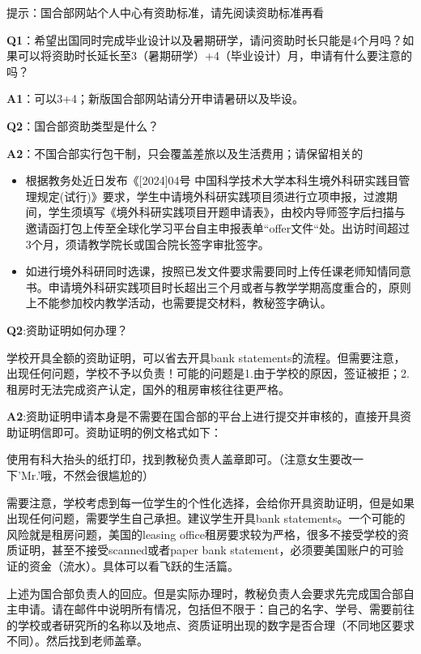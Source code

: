 \begin{qa}[资助问题]

{\small 提示：国合部网站个人中心有资助标准，请先阅读资助标准再看}

\textbf{Q1}：希望出国同时完成毕业设计以及暑期研学，请问资助时长只能是4个月吗？如果可以将资助时长延长至3（暑期研学）+4（毕业设计）月，申请有什么要注意的吗？

\textbf{A1}：可以3+4；新版国合部网站请分开申请暑研以及毕设。

\textbf{Q2}：国合部资助类型是什么？

\textbf{A2}：不国合部实行包干制，只会覆盖差旅以及生活费用；请保留相关的
\end{qa}


\begin{qa}[其他材料提交]
    \begin{itemize}
        \item 根据教务处近日发布《[2024]04号 中国科学技术大学本科生境外科研实践目管理规定(试行)》要求，学生中请境外科研实践项目须进行立项申报，过渡期间，学生须填写《境外科研实践项目开题申请表》，由校内导师签字后扫描与邀请函打包上传至全球化学习平台自主申报表单“offer文件“处。出访时间超过3个月，须请教学院长或国合院长签字审批签字。
        \item 如进行境外科研同时选课，按照已发文件要求需要同时上传任课老师知情同意书。申请境外科研实践项目时长超出三个月或者与教学学期高度重合的，原则上不能参加校内教学活动，也需要提交材料，教秘签字确认。
    \end{itemize}    
\end{qa}
\begin{qa}[资助证明办理问题]

\textbf{Q2}:资助证明如何办理？

{\small 学校开具全额的资助证明，可以省去开具bank statements的流程。但需要注意，出现任何问题，学校不予以负责！可能的问题是1.由于学校的原因，签证被拒；2.租房时无法完成资产认定，国外的租房审核往往更严格。}

\textbf{A2}:资助证明申请本身是不需要在国合部的平台上进行提交并审核的，直接开具资助证明信即可。资助证明的例文格式如下：

使用有科大抬头的纸打印，找到教秘负责人盖章即可。（注意女生要改一下'Mr.'哦，不然会很尴尬的）

需要注意，学校考虑到每一位学生的个性化选择，会给你开具资助证明，但是如果出现任何问题，需要学生自己承担。建议学生开具bank statements。一个可能的风险就是租房问题，美国的leasing office租房要求较为严格，很多不接受学校的资质证明，甚至不接受scanned或者paper bank statement，必须要美国账户的可验证的资金（流水）。具体可以看飞跃的生活篇。

\begin{remark}
    上述为国合部负责人的回应。但是实际办理时，教秘负责人会要求先完成国合部自主申请。请在邮件中说明所有情况，包括但不限于：自己的名字、学号、需要前往的学校或者研究所的名称以及地点、资质证明出现的数字是否合理（不同地区要求不同）。然后找到老师盖章。
\end{remark}

\end{qa}

